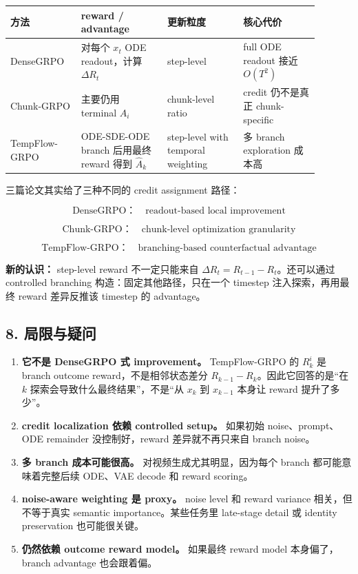 \begin{center}
{\small
\setlength{\tabcolsep}{3pt}
\begin{tabular}{p{0.20\linewidth}p{0.25\linewidth}p{0.22\linewidth}p{0.22\linewidth}}
\toprule
方法 & reward / advantage & 更新粒度 & 核心代价 \\
\midrule
DenseGRPO & 对每个 \(x_t\) ODE readout，计算 \(\Delta R_t\) & step-level & full ODE readout 接近 \(O(T^2)\) \\
Chunk-GRPO & 主要仍用 terminal \(A_i\) & chunk-level ratio & credit 仍不是真正 chunk-specific \\
TempFlow-GRPO & ODE-SDE-ODE branch 后用最终 reward 得到 \(\hat{A}_k\) & step-level with temporal weighting & 多 branch exploration 成本高 \\
\bottomrule
\end{tabular}
}
\end{center}

三篇论文其实给了三种不同的 credit assignment 路径：

\[
\text{DenseGRPO：}
\quad
\text{readout-based local improvement}
\]

\[
\text{Chunk-GRPO：}
\quad
\text{chunk-level optimization granularity}
\]

\[
\text{TempFlow-GRPO：}
\quad
\text{branching-based counterfactual advantage}
\]

\begin{summarybox}
\textbf{新的认识：} step-level reward 不一定只能来自 \(\Delta R_t=R_{t-1}-R_t\)。还可以通过 controlled branching 构造：固定其他路径，只在一个 timestep 注入探索，再用最终 reward 差异反推该 timestep 的 advantage。
\end{summarybox}

\subsection{8. 局限与疑问}

\begin{enumerate}[leftmargin=1.5em]
  \item \textbf{它不是 DenseGRPO 式 improvement。} TempFlow-GRPO 的 \(R_k^i\) 是 branch outcome reward，不是相邻状态差分 \(R_{k-1}-R_k\)。因此它回答的是“在 \(k\) 探索会导致什么最终结果”，不是“从 \(x_k\) 到 \(x_{k-1}\) 本身让 reward 提升了多少”。
  \item \textbf{credit localization 依赖 controlled setup。} 如果初始 noise、prompt、ODE remainder 没控制好，reward 差异就不再只来自 branch noise。
  \item \textbf{多 branch 成本可能很高。} 对视频生成尤其明显，因为每个 branch 都可能意味着完整后续 ODE、VAE decode 和 reward scoring。
  \item \textbf{noise-aware weighting 是 proxy。} noise level 和 reward variance 相关，但不等于真实 semantic importance。某些任务里 late-stage detail 或 identity preservation 也可能很关键。
  \item \textbf{仍然依赖 outcome reward model。} 如果最终 reward model 本身偏了，branch advantage 也会跟着偏。
\end{enumerate}

